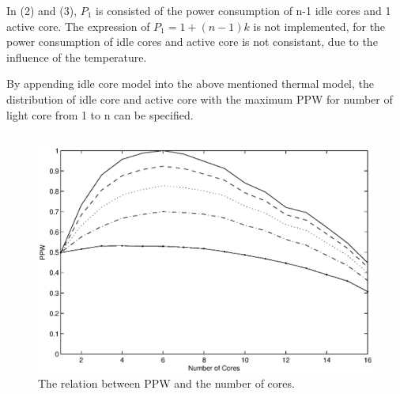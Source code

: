 In (2) and (3), $P_{1}$ is consisted of the power consumption of n-1 idle cores and 1 active 
core. The expression of $P_{1} = 1+(n-1)k$ is not implemented, for the power consumption of 
idle cores and active core is not consistant, due to the influence of the temperature.

By appending idle core model into the above mentioned thermal model, the distribution of idle
core and active core with the maximum PPW for number of light core from 1 to n can be specified.

\subsection{}

\begin{figure}
\centering
\includegraphics[width=1\columnwidth]{fig/ppw_alpha_ratio.eps}
\caption{The relation between PPW and the number of cores.
}
\label{fig:ppw_alpha_ratio}
\end{figure}